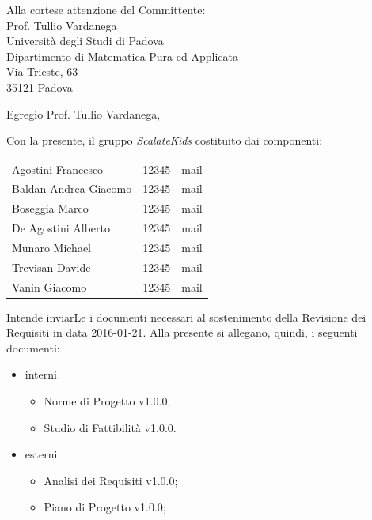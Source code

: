 \documentclass{letter}
\begin{document}
\pagestyle{fancy}
\rhead{
  \slshape \leftmark
}
\date{Padova, 21 Gennaio 2016}
\begin{letter} {
    Alla cortese attenzione del Committente: \\
    Prof. Tullio Vardanega \\
    Università degli Studi di Padova \\
    Dipartimento di Matematica Pura ed Applicata \\
    Via Trieste, 63 \\
    35121 Padova
  }
  \opening{Egregio Prof. Tullio Vardanega,}
  Con la presente, il gruppo \textit{ScalateKids} costituito dai componenti:
  \begin{center}
    \begin{tabular}[H]{l l l}
      Agostini Francesco & 12345 & mail \\
      Baldan Andrea Giacomo & 12345 & mail \\
      Boseggia Marco & 12345 & mail \\
      De Agostini Alberto & 12345 & mail \\
      Munaro Michael & 12345 & mail \\
      Trevisan Davide & 12345 & mail \\
      Vanin Giacomo & 12345 & mail \\
    \end{tabular}
  \end{center}
  Intende inviarLe i documenti necessari al sostenimento della Revisione dei Requisiti in data 2016-01-21.
  Alla presente si allegano, quindi, i seguenti documenti:
  \begin{itemize}
  \item interni
    \begin{itemize}
    \item Norme di Progetto v1.0.0;
    \item Studio di Fattibilità v1.0.0.
    \end{itemize}
  \item esterni
    \begin{itemize}
    \item Analisi dei Requisiti v1.0.0;
    \item Piano di Progetto v1.0.0;

\end{itemize}
\end{itemize}
\end{letter}
\end{document}
